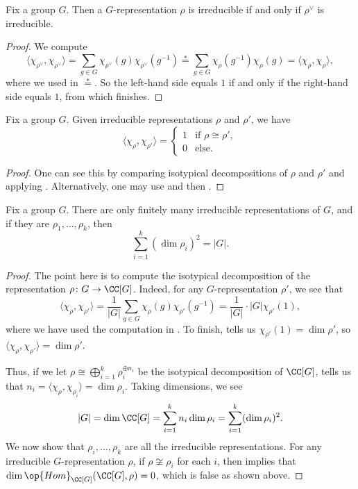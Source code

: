 \documentclass{article}
\begin{document}
\begin{corollary} \label{cor:irred-iff-dual-irrep}
	Fix a group $G$. Then a $G$-representation $\rho$ is irreducible if and only if $\rho^\lor$ is irreducible.
\end{corollary}
\begin{proof}
	We compute
	\[\langle\chi_{\rho^\lor},\chi_{\rho^\lor}\rangle=\sum_{g\in G}\chi_{\rho^\lor}(g)\chi_{\rho^\lor}\left(g^{-1}\right)\stackrel*=\sum_{g\in G}\chi_\rho\left(g^{-1}\right)\chi_\rho(g)=\langle\chi_\rho,\chi_\rho\rangle,\]
	where we used  in $\stackrel*=$. So the left-hand side equals $1$ if and only if the right-hand side equals $1$, from which  finishes.
\end{proof}
\begin{corollary} \label{cor:first-ortho}
	Fix a group $G$. Given irreducible representations $\rho$ and $\rho'$, we have
	\[\langle\chi_\rho,\chi_{\rho'}\rangle=\begin{cases}
		1 & \text{if }\rho\cong\rho', \\
		0 & \text{else}.
	\end{cases}\]
\end{corollary}
\begin{proof}
	One can see this by comparing isotypical decompositions of $\rho$ and $\rho'$ and applying . Alternatively, one may use  and then .
\end{proof}
\begin{corollary} \label{cor:square-sum-irreps}
	Fix a group $G$. There are only finitely many irreducible representations of $G$, and if they are $\rho_1,\ldots,\rho_k$, then
	\[\sum_{i=1}^k(\dim\rho_i)^2=|G|.\]
\end{corollary}
\begin{proof}
	The point here is to compute the isotypical decomposition of the representation $\rho\colon G\to\CC[G]$. Indeed, for any $G$-representation $\rho'$, we see that
	\[\langle\chi_\rho,\chi_{\rho'}\rangle=\frac1{|G|}\sum_{g\in G}\chi_\rho(g)\chi_{\rho'}\left(g^{-1}\right)=\frac1{|G|}\cdot|G|\chi_{\rho'}(1),\]
	where we have used the computation in . To finish,  tells us $\chi_{\rho'}(1)=\dim\rho'$, so $\langle\chi_\rho,\chi_{\rho'}\rangle=\dim\rho'$.

	Thus, if we let $\rho\cong\bigoplus_{i=1}^k\rho_i^{\oplus n_i}$ be the isotypical decomposition of $\CC[G]$,  tells us that $n_i=\langle\chi_\rho,\chi_{\rho_i}\rangle=\dim\rho_i$. Taking dimensions, we see
	\[|G|=\dim\CC[G]=\sum_{i=1}^kn_i\dim\rho_i=\sum_{i=1}^k(\dim\rho_i)^2.\]
	We now show that $\rho_i,\ldots,\rho_k$ are all the irreducible representations. For any irreducible $G$-representation $\rho$, if $\rho\not\cong\rho_i$ for each $i$, then  implies that $\dim\op{Hom}_{\CC[G]}(\CC[G],\rho)=0$, which is false as shown above.
\end{proof}
\end{document}

